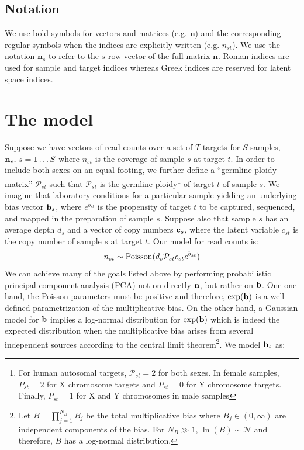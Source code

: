 \documentclass[nofootinbib,amssymb,amsmath]{revtex4}
\newcommand{\vb}{{\bf b}}
\newcommand{\vc}{{\bf c}}
\newcommand{\vn}{{\bf n}}
\newcommand{\PP}{\mathcal{P}}
\begin{document}
\subsection{Notation}
We use bold symbols for vectors and matrices (e.g. $\mathbf{n}$) and the corresponding regular symbols when the indices are explicitly written (e.g. $n_{st}$). We use the notation $\mathbf{n}_s$ to refer to the $s$ row vector of the full matrix $\mathbf{n}$. Roman indices are used for sample and target indices whereas Greek indices are reserved for latent space indices.

\section{The model}
Suppose we have vectors of read counts over a set of $T$ targets for $S$ samples, $\vn_s, \, s = 1 \ldots S$ where $n_{st}$ is the coverage of sample $s$ at target $t$. In order to include both sexes on an equal footing, we further define a ``germline ploidy matrix'' $\PP_{st}$ such that $\PP_{st}$ is the germline ploidy\footnote{For human autosomal targets, $\PP_{st} = 2$ for both sexes. In female samples, $P_{st} = 2$ for X chromosome targets and $P_{st} = 0$ for Y chromosome targets. Finally, $P_{st} = 1$ for X and Y chromosomes in male samples} of target $t$ of sample $s$. We imagine that laboratory conditions for a particular sample yielding an underlying bias vector $\vb_s$, where $e^{b_{st}}$ is the propensity of target $t$ to be captured, sequenced, and mapped in the preparation of sample $s$. Suppose also that sample $s$ has an average depth $d_s$ and a vector of copy numbers $\vc_s$, where the latent variable $c_{st}$ is the copy number of sample $s$ at target $t$. Our model for read counts is:
%
\begin{equation}
n_{st} \sim {\rm Poisson}(d_s \PP_{st} c_{st} e^{b_{st}})
\label{coverage_model}
\end{equation}
We can achieve many of the goals listed above by performing probabilistic principal component analysis (PCA) not on directly $\vn$, but rather on $\vb$. One one hand, the Poisson parameters must be positive and therefore, $\exp(\vb)$ is a well-defined parametrization of the multiplicative bias. On the other hand, a Gaussian model for $\vb$ implies a log-normal distribution for $\exp(\vb)$ which is indeed the expected distribution when the multiplicative bias arises from several independent sources according to the central limit theorem\footnote{Let $B = \prod_{j=1}^{N_B} B_j$ be the total multiplicative bias where $B_j \in (0, \infty)$ are independent components of the bias. For $N_B \gg 1$, $\ln(B) \sim \mathcal{N}$ and therefore, $B$ has a log-normal distribution.}. We model $\vb_s$ as:
\end{document}
